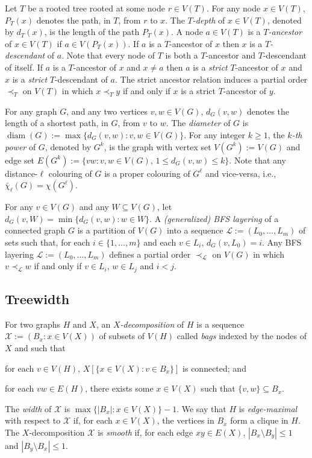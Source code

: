 \documentclass[kpfonts]{patmorin}
\DeclareMathOperator{\diam}{diam}
\newcommand{\dlcn}{\bar{\chi}_\ell}
\theoremstyle{named}
\begin{document}
Let $T$ be a rooted tree rooted at some node $r\in V(T)$.  For any node $x\in V(T)$, $P_T(x)$ denotes the path, in $T$, from $r$ to $x$.  The \emph{$T$-depth} of $x\in V(T)$, denoted by $d_T(x)$, is the length of the path $P_T(x)$.  A node $a\in V(T)$ is a \emph{$T$-ancestor} of $x\in V(T)$ if $a\in V(P_T(x))$. If $a$ is a $T$-ancestor of $x$ then $x$ is a \emph{$T$-descendant} of $a$.  Note that every node of $T$ is both a $T$-ancestor and $T$-descendant of itself.  If $a$ is a $T$-ancestor of $x$ and $x\neq a$ then $a$ is a \emph{strict} $T$-ancestor of $x$ and $x$ is a \emph{strict} $T$-descendant of $a$.  The strict ancestor relation induces a partial order $\prec_T$ on $V(T)$ in which $x\prec_T y$ if and only if $x$ is a strict $T$-ancestor of $y$.

For any graph $G$, and any two vertices $v,w\in V(G)$, $d_G(v,w)$ denotes the length of a shortest path, in $G$, from $v$ to $w$. The \emph{diameter} of $G$ is $\diam(G):=\max\{d_G(v,w):v,w\in V(G)\}$. For any integer $k\ge 1$, the \emph{$k$-th power} of $G$, denoted by $G^k$, is the graph with vertex set $V(G^k):=V(G)$ and edge set $E(G^{k}):=\{vw:v,w\in V(G),\, 1\le d_G(v,w)\le k\}$.
Note that any distance-$\ell$ colouring of $G$ is a proper colouring of $G^\ell$ and vice-versa, i.e., $\dlcn(G)=\chi(G^\ell)$.

For any $v\in V(G)$ and any $W\subseteq V(G)$, let $d_G(v,W)=\min\{d_G(v,w):w\in W\}$. A \emph{(generalized) BFS layering} of a connected graph $G$ is a partition of $V(G)$ into a sequence $\mathcal{L}:=(L_0,\ldots,L_m)$ of sets such that, for each $i\in\{1,\ldots,m\}$ and each $v\in L_i$, $d_G(v,L_0)=i$.  Any BFS layering $\mathcal{L}:=(L_0,\ldots,L_m)$ defines a partial order $\prec_{\mathcal{L}}$ on $V(G)$ in which $v\prec_{\mathcal{L}} w$ if and only if $v\in L_i$, $w\in L_j$ and $i<j$.




\subsection{Treewidth}

For two graphs $H$ and $X$, an \emph{$X$-decomposition} of $H$ is a sequence $\mathcal{X}:=(B_x:x\in V(X))$ of subsets of $V(H)$ called \emph{bags} indexed by the nodes of $X$ and such that
 \begin{inparaenum}[(i)]
     \item for each $v\in V(H)$, $X[\{x\in V(X):v\in B_x\}]$ is connected; and
     \item for each $vw\in E(H)$, there exists some $x\in V(X)$ such that $\{v,w\}\subseteq B_x$.
\end{inparaenum}
The \emph{width} of $\mathcal{X}$ is $\max\{|B_x|:x\in V(X)\}-1$. We say that $H$ is \emph{edge-maximal} with respect to $\mathcal{X}$ if, for each $x\in V(X)$, the vertices in $B_x$ form a clique in $H$. The $X$-decomposition $\mathcal{X}$ is \emph{smooth} if, for each edge $xy\in E(X)$, $|B_x\setminus B_y|\le 1$ and $|B_y\setminus B_x|\le 1$.
\end{document}

